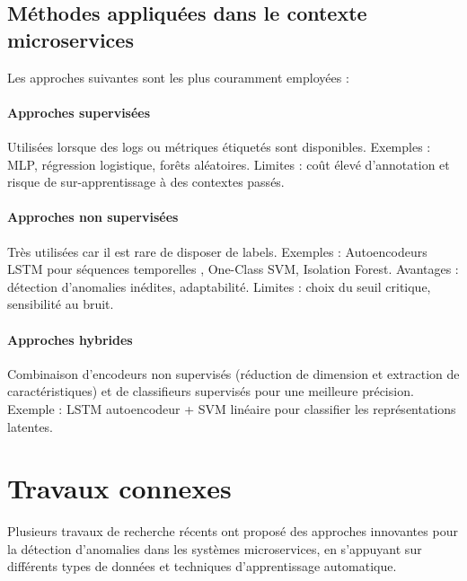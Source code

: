\documentclass[a4paper,12pt]{report}
\begin{document}
\subsection{Méthodes appliquées dans le contexte microservices}

Les approches suivantes sont les plus couramment employées \cite{muruti2023_detectio_anomalies_generalite, nobre2023, behera2023_model_of_anomalie}:

\paragraph{Approches supervisées}
Utilisées lorsque des logs ou métriques étiquetés sont disponibles.  
Exemples : MLP, régression logistique, forêts aléatoires.  
Limites : coût élevé d’annotation et risque de sur-apprentissage à des contextes passés.

\paragraph{Approches non supervisées}
Très utilisées car il est rare de disposer de labels.  
Exemples : Autoencodeurs LSTM pour séquences temporelles \cite{silva2022_auto_encodeur}, One-Class SVM, Isolation Forest.  
Avantages : détection d’anomalies inédites, adaptabilité.  
Limites : choix du seuil critique, sensibilité au bruit.

\paragraph{Approches hybrides}
Combinaison d’encodeurs non supervisés (réduction de dimension et extraction de caractéristiques) et de classifieurs supervisés pour une meilleure précision.  
Exemple : LSTM autoencodeur + SVM linéaire pour classifier les représentations latentes.


\section{Travaux connexes}

Plusieurs travaux de recherche récents ont proposé des approches innovantes pour la détection d’anomalies dans les systèmes microservices, en s’appuyant sur différents types de données et techniques d’apprentissage automatique.
\end{document}

